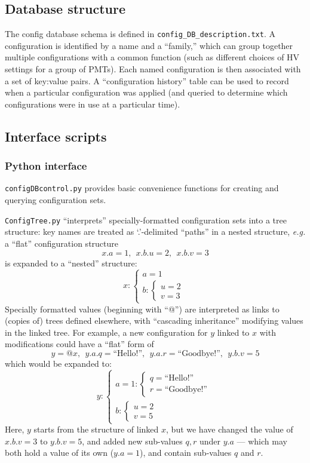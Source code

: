 \documentclass[12pt,english]{article}
\newcommand{\cd}[1]{\texttt{#1}}
\begin{document}
%
%
\subsection{Database structure}

The config database schema is defined in \cd{config\_DB\_description.txt}.
A configuration is identified by a name and a ``family,'' which can group together multiple
	configurations with a common function (such as different choices of HV settings for a group of PMTs).
Each named configuration is then associated with a set of key:value pairs.
A ``configuration history'' table can be used to record when a particular configuration was applied
	(and queried to determine which configurations were in use at a particular time).

%
%
\subsection{Interface scripts}

%
\subsubsection{Python interface}

\cd{configDBcontrol.py} provides basic convenience functions for creating and querying configuration sets.

\cd{ConfigTree.py} ``interprets'' specially-formatted configuration sets into a tree structure:
	key names are treated as `.'-delimited ``paths'' in a nested structure,
	{\em e.g.} a ``flat'' configuration structure
\[ x.a = 1,\ \ x.b.u = 2,\ \ x.b.v = 3 \]
is expanded to a ``nested'' structure:
\newcommand{\brarray}[1]{\left\{ \begin{array}{l} #1  \end{array} \right.}
\[ x: \brarray{a = 1 \\ b: \brarray{u = 2 \\ v = 3}}\]
Specially formatted values (beginning with ``@'') are interpreted as links to (copies of) trees defined elsewhere,
	with ``cascading inheritance'' modifying values in the linked tree.
For example, a new configuration for $y$ linked to $x$ with modifications could have a ``flat'' form of
\[ y = @x,\ \ y.a.q = \textrm{``Hello!''},\ \ y.a.r = \textrm{``Goodbye!''},\ \ y.b.v = 5 \]
which would be expanded to:
\[ y: \brarray{a = 1: \brarray{q = \textrm{``Hello!''} \\ r = \textrm{``Goodbye!''}} \\ b: \brarray{u = 2 \\ v = 5}} \]
Here, $y$ starts from the structure of linked $x$, but we have changed the value of $x.b.v = 3$ to $y.b.v = 5$,
	and added new sub-values $q,r$ under $y.a$ --- which may both hold a value of its own ($y.a = 1$), and contain sub-values $q$ and $r$.
\end{document}
